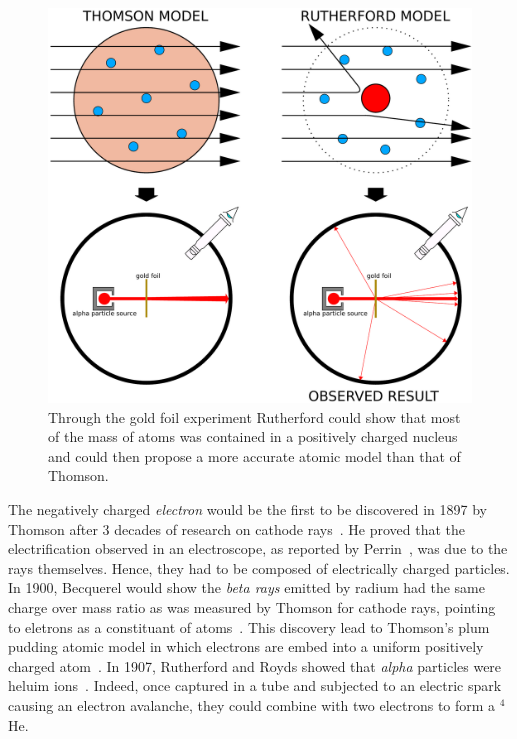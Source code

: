 	\begin{figure}[H]
		\centering
		\includegraphics[width=\plotwidth]{fig/chapt2/Thomson_Rutherford_atoms.pdf}
		\caption{\label{fig:Atom_models} Through the gold foil experiment Rutherford could show that most of the mass of atoms was contained in a positively charged nucleus and could then propose a more accurate atomic model than that of Thomson.}
	\end{figure}
	
	The negatively charged \textit{electron} would be the first to be discovered in 1897 by Thomson after 3 decades of research on cathode rays~\cite{THOMSON1897}. He proved that the electrification observed in an electroscope, as reported by Perrin~\cite{PERRIN1895}, was due to the rays themselves. Hence, they had to be composed of electrically charged particles. In 1900, Becquerel would show the \textit{beta rays} emitted by radium had the same charge over mass ratio as was measured by Thomson for cathode rays, pointing to eletrons as a constituant of atoms~\cite{BECQUEREL1900}. This discovery lead to Thomson's plum pudding atomic model in which electrons are embed into a uniform positively charged atom~\cite{THOMSON1904}. In 1907, Rutherford and Royds showed that \textit{alpha} particles were heluim ions~\cite{RUTHERFORD1908}. Indeed, once captured in a tube and subjected to an electric spark causing an electron avalanche, they could combine with two electrons to form a $^4$He.
	

